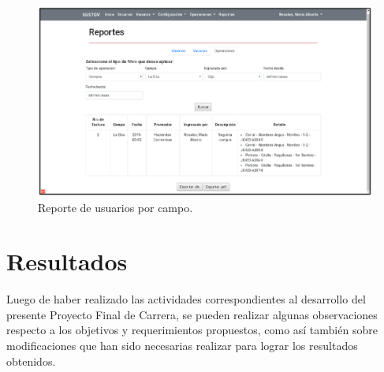 \documentclass[11pt,oneside]{book}
\begin{document}
\begin{figure}[tbhp]
\centerline{\includegraphics[scale=0.87]{figs/capitulo_4_desarrollo/fig427.pdf}}
\caption{Reporte de usuarios por campo.}
\label{fig427}
\end{figure}

\newpage
\section{Resultados}
Luego de haber realizado las actividades correspondientes al desarrollo del presente Proyecto Final de Carrera, se pueden realizar algunas observaciones respecto a los objetivos y requerimientos propuestos, como así también sobre modificaciones que han sido necesarias realizar para lograr los resultados obtenidos.
\end{document}
